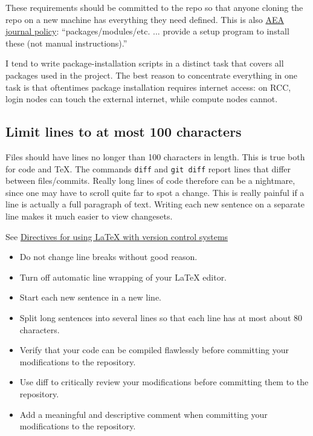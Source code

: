 These requirements should be committed to the repo so that anyone cloning the repo on a new machine has everything they need defined.
This is also \href{https://aeadataeditor.github.io/aea-de-guidance/preparing-for-data-deposit.html}{AEA journal policy}:
``packages/modules/etc. ... provide a setup program to install these (not manual instructions).''

I tend to write package-installation scripts in a distinct task that covers all packages used in the project.
The best reason to concentrate everything in one task is that oftentimes package installation requires internet access:
on RCC, login nodes can touch the external internet, while compute nodes cannot.

\subsection{Limit lines to at most 100 characters}

Files should have lines no longer than 100 characters in length.
This is true both for code and \TeX.
The commands \texttt{diff} and \texttt{git diff} report lines that differ between files/commits.
Really long lines of code therefore can be a nightmare, since one may have to scroll quite far to spot a change.
This is really painful if a line is actually a full paragraph of text.
Writing each new sentence on a separate line makes it much easier to view changesets.

See \href{https://en.wikibooks.org/wiki/LaTeX/Collaborative_Writing_of_LaTeX_Documents\#Subversion_really_makes_the_difference}{Directives for using LaTeX with version control systems}
\begin{itemize}
\item Do not change line breaks without good reason.
\item Turn off automatic line wrapping of your LaTeX editor.
\item Start each new sentence in a new line.
\item Split long sentences into several lines so that each line has at most about 80 characters.
\item Verify that your code can be compiled flawlessly before committing your modifications to the repository.
\item Use diff to critically review your modifications before committing them to the repository.
\item Add a meaningful and descriptive comment when committing your modifications to the repository.
\end{itemize}
